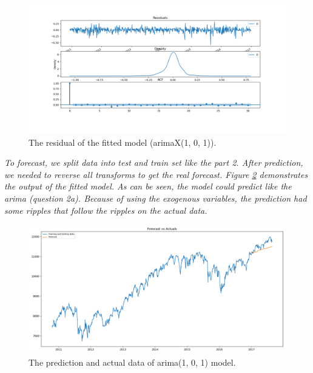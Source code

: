 \begin{figure}[H]
    \centering
    \begin{minipage}[b]{1\textwidth}
        \includegraphics[width=\textwidth]{manuscript/src/figures/Ass2/Ass2_Q3_residual_plot.png}
    \end{minipage}
    \caption{The residual of the fitted model (\gls{arima}X(1, 0, 1)).}
    \label{fig:Ass2_Q3_residual_plot}
\end{figure}

\textit{To forecast, we split data into test and train set like the part 2. After prediction, we needed to reverse all transforms to get the real forecast. Figure \ref{fig:Ass2_Q3_Forecast_vs_Actuals} demonstrates the output of the fitted model. As can be seen, the model could predict like the \gls{arima} (question 2a). Because of using the exogenous variables, the prediction had some ripples that follow the ripples on the actual data.}

\begin{figure}[H]
    \centering
    \begin{minipage}[b]{1\textwidth}
        \includegraphics[width=\textwidth]{manuscript/src/figures/Ass2/Ass2_Q3_Forecast_vs_Actuals.png}
    \end{minipage}
    \caption{The prediction and actual data of \gls{arima}(1, 0, 1) model.}
    \label{fig:Ass2_Q3_Forecast_vs_Actuals}
\end{figure}





